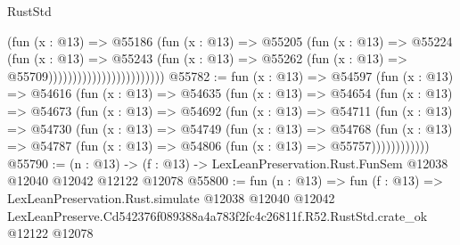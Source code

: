 \begin{lexlean}{RustStd}
\begin{coremodule}
                                        (fun (x : @13) =>
                                        @55186
                                          (fun (x : @13) =>
                                          @55205
                                            (fun (x : @13) =>
                                            @55224
                                              (fun (x : @13) =>
                                              @55243
                                                (fun (x : @13) =>
                                                @55262
                                                  (fun (x : @13) => @55709))))))))))))))))))))))))
@55782 := fun (x : @13) =>
  @54597
    (fun (x : @13) =>
    @54616
      (fun (x : @13) =>
      @54635
        (fun (x : @13) =>
        @54654
          (fun (x : @13) =>
          @54673
            (fun (x : @13) =>
            @54692
              (fun (x : @13) =>
              @54711
                (fun (x : @13) =>
                @54730
                  (fun (x : @13) =>
                  @54749
                    (fun (x : @13) =>
                    @54768
                      (fun (x : @13) =>
                      @54787 (fun (x : @13) => @54806 (fun (x : @13) => @55757))))))))))))
@55790 := (n : @13) ->
  (f : @13) -> LexLeanPreservation.Rust.FunSem @12038 @12040 @12042 @12122 @12078
@55800 := fun (n : @13) =>
  fun (f : @13) =>
  LexLeanPreservation.Rust.simulate
    @12038
    @12040
    @12042
    LexLeanPreserve.Cd542376f089388a4a783f2fc4c26811f.R52.RustStd.crate_ok
    @12122
    @12078
\end{coremodule}
\end{lexlean}
